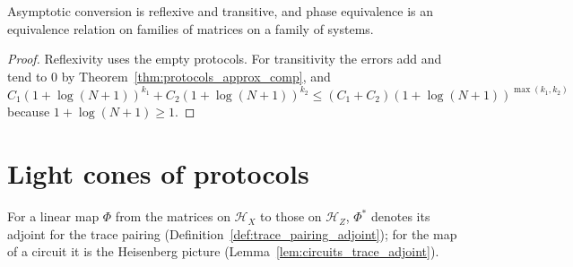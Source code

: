\begin{theorem}
    \label{thm:protocols_phase_equivalence}
    \leanok
    Asymptotic conversion is reflexive and transitive, and phase equivalence is an
    equivalence relation on families of matrices on a family of systems.
\end{theorem}
\begin{proof}\leanok
    Reflexivity uses the empty protocols. For transitivity the errors add and tend to $0$ by
    Theorem~\ref{thm:protocols_approx_comp}, and
    $C_1(1+\log(N+1))^{k_1}+C_2(1+\log(N+1))^{k_2}\le(C_1+C_2)(1+\log(N+1))^{\max(k_1,k_2)}$
    because $1+\log(N+1)\ge1$.
\end{proof}

\section{Light cones of protocols}
\label{sec:protocols_light_cones}

For a linear map $\Phi$ from the matrices on $\mathcal H_X$ to those on $\mathcal H_Z$,
$\Phi^*$ denotes its adjoint for the trace pairing (Definition~\ref{def:trace_pairing_adjoint});
for the map of a circuit it is the Heisenberg picture (Lemma~\ref{lem:circuits_trace_adjoint}).

